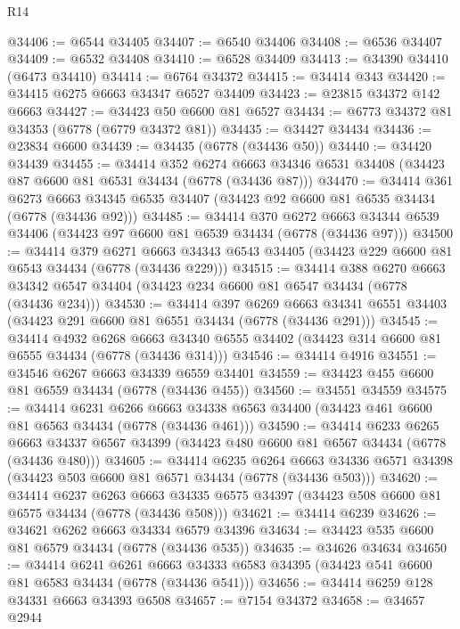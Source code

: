 \begin{lexlean}{R14}
\begin{coremodule}
@34406 := @6544 @34405
@34407 := @6540 @34406
@34408 := @6536 @34407
@34409 := @6532 @34408
@34410 := @6528 @34409
@34413 := @34390 @34410 (@6473 @34410)
@34414 := @6764 @34372
@34415 := @34414 @343
@34420 := @34415 @6275 @6663 @34347 @6527 @34409
@34423 := @23815 @34372 @142 @6663
@34427 := @34423 @50 @6600 @81 @6527
@34434 := @6773 @34372 @81 @34353 (@6778 (@6779 @34372 @81))
@34435 := @34427 @34434
@34436 := @23834 @6600
@34439 := @34435 (@6778 (@34436 @50))
@34440 := @34420 @34439
@34455 := @34414
    @352
    @6274
    @6663
    @34346
    @6531
    @34408
    (@34423 @87 @6600 @81 @6531 @34434 (@6778 (@34436 @87)))
@34470 := @34414
    @361
    @6273
    @6663
    @34345
    @6535
    @34407
    (@34423 @92 @6600 @81 @6535 @34434 (@6778 (@34436 @92)))
@34485 := @34414
    @370
    @6272
    @6663
    @34344
    @6539
    @34406
    (@34423 @97 @6600 @81 @6539 @34434 (@6778 (@34436 @97)))
@34500 := @34414
    @379
    @6271
    @6663
    @34343
    @6543
    @34405
    (@34423 @229 @6600 @81 @6543 @34434 (@6778 (@34436 @229)))
@34515 := @34414
    @388
    @6270
    @6663
    @34342
    @6547
    @34404
    (@34423 @234 @6600 @81 @6547 @34434 (@6778 (@34436 @234)))
@34530 := @34414
    @397
    @6269
    @6663
    @34341
    @6551
    @34403
    (@34423 @291 @6600 @81 @6551 @34434 (@6778 (@34436 @291)))
@34545 := @34414
    @4932
    @6268
    @6663
    @34340
    @6555
    @34402
    (@34423 @314 @6600 @81 @6555 @34434 (@6778 (@34436 @314)))
@34546 := @34414 @4916
@34551 := @34546 @6267 @6663 @34339 @6559 @34401
@34559 := @34423 @455 @6600 @81 @6559 @34434 (@6778 (@34436 @455))
@34560 := @34551 @34559
@34575 := @34414
    @6231
    @6266
    @6663
    @34338
    @6563
    @34400
    (@34423 @461 @6600 @81 @6563 @34434 (@6778 (@34436 @461)))
@34590 := @34414
    @6233
    @6265
    @6663
    @34337
    @6567
    @34399
    (@34423 @480 @6600 @81 @6567 @34434 (@6778 (@34436 @480)))
@34605 := @34414
    @6235
    @6264
    @6663
    @34336
    @6571
    @34398
    (@34423 @503 @6600 @81 @6571 @34434 (@6778 (@34436 @503)))
@34620 := @34414
    @6237
    @6263
    @6663
    @34335
    @6575
    @34397
    (@34423 @508 @6600 @81 @6575 @34434 (@6778 (@34436 @508)))
@34621 := @34414 @6239
@34626 := @34621 @6262 @6663 @34334 @6579 @34396
@34634 := @34423 @535 @6600 @81 @6579 @34434 (@6778 (@34436 @535))
@34635 := @34626 @34634
@34650 := @34414
    @6241
    @6261
    @6663
    @34333
    @6583
    @34395
    (@34423 @541 @6600 @81 @6583 @34434 (@6778 (@34436 @541)))
@34656 := @34414 @6259 @128 @34331 @6663 @34393 @6508
@34657 := @7154 @34372
@34658 := @34657 @2944

\end{coremodule}
\end{lexlean}

